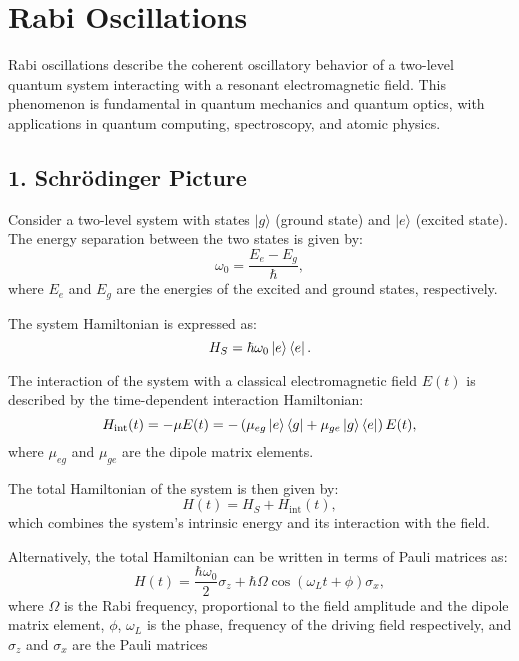 
\section{Rabi Oscillations}

Rabi oscillations describe the coherent oscillatory behavior of a two-level quantum system interacting with a resonant electromagnetic field. 
This phenomenon is fundamental in quantum mechanics and quantum optics, with applications in quantum computing, spectroscopy, and atomic physics.

\subsection{1. Schrödinger Picture}
Consider a two-level system with states \(|g\rangle\) (ground state) and \(|e\rangle\) (excited state). 
The energy separation between the two states is given by:
\begin{equation}
	\omega_0 = \frac{E_e - E_g}{\hbar},
	\label{eq:EnergySeparation}
\end{equation}
where \(E_e\) and \(E_g\) are the energies of the excited and ground states, respectively.

The system Hamiltonian is expressed as:
\begin{equation}
	H_S = \hbar \omega_0 \ket{e}\bra{e}.
	\label{eq:SystemHamiltonian}
\end{equation}


The interaction of the system with a classical electromagnetic field \(E(t)\) is described by the time-dependent interaction Hamiltonian:
\begin{equation}
	H_{\text{int}}(t) = - \mu E(t) = -\left( \mu_{eg} \ket{e}\bra{g} + \mu_{ge} \ket{g}\bra{e} \right) E(t),
	\label{eq:InteractionHamiltonian}
\end{equation}
where \(\mu_{eg}\) and \(\mu_{ge}\) are the dipole matrix elements.

The total Hamiltonian of the system is then given by:
\begin{equation}
	H(t) = H_S + H_{\text{int}}(t),
	\label{eq:TotalHamiltonian}
\end{equation}
which combines the system's intrinsic energy and its interaction with the field.

Alternatively, the total Hamiltonian can be written in terms of Pauli matrices as:
\begin{equation}
	H(t) = \frac{\hbar \omega_0}{2} \sigma_z + \hbar \Omega \cos(\omega_L t + \phi) \sigma_x,
	\label{eq:RabiHamiltonian}
\end{equation}
where \(\Omega\) is the Rabi frequency, proportional to the field amplitude and the dipole matrix element, \(\phi\), \(\omega_L\) is the phase, frequency of the driving field respectively, and \(\sigma_z\) and \(\sigma_x\) are the Pauli matrices

